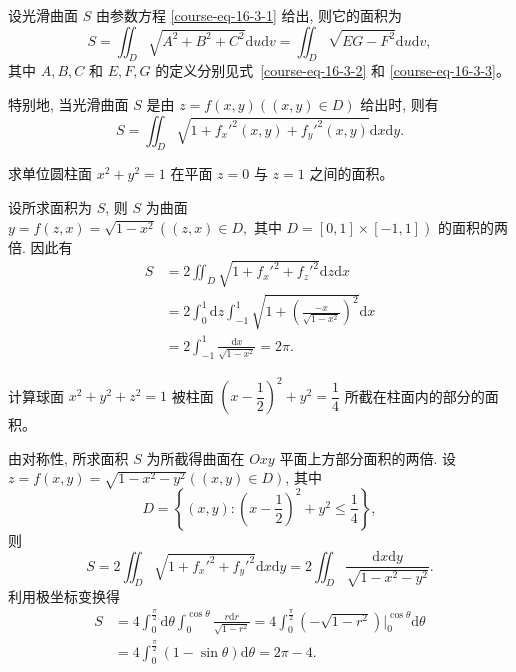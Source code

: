 \documentclass[12pt,fontset=fandol]{ctexart}
\begin{document}
\begin{theorem}\label{course-theorem-16-3-1}\quad 设光滑曲面 $S$ 由参数方程 \eqref{course-eq-16-3-1}  给出, 则它的面积为
\[
  S=\iint_D \sqrt{A^2+B^2+C^2}\mathrm du\mathrm dv
  =\iint_D \sqrt{EG-F^2}\mathrm du\mathrm dv,
\]
其中 $A,B,C$ 和 $E,F,G$ 的定义分别见式~\eqref{course-eq-16-3-2}  和 \eqref{course-eq-16-3-3}。

特别地, 当光滑曲面 $S$ 是由 $z=f(x,y)((x,y)\in D)$ 给出时, 则有
\[
  S=\iint_D \sqrt{1+f_x'^2(x,y)+f_y'^2(x,y)}\mathrm dx\mathrm dy.
\]

\end{theorem}
\begin{example}\label{course-example-16-3-1}\quad 求单位圆柱面 $x^2+y^2=1$ 在平面 $z=0$ 与 $z=1$ 之间的面积。

\end{example}
\begin{solve}\quad 设所求面积为 $S$, 则 $S$ 为曲面 $y=f(z,x)=\sqrt{1-x^2}((z,x)\in D,\text{ 其中 }D=[0,1]\times[-1,1])$ 的面积的两倍. 因此有
\[
\begin{aligned}
  S&=2\iint_D\sqrt{1+f_x'^2+f_z'^2}\mathrm dz\mathrm dx\\
  &=2\int_0^1\mathrm dz\int_{-1}^1\sqrt{1+\left(\frac{-x}{\sqrt{1-x^2}}\right)^2}\mathrm dx\\
  &=2\int_{-1}^1\frac{\mathrm dx}{\sqrt{1-x^2}}=2\pi.
\end{aligned}
\]

\end{solve}
\begin{example}\label{course-example-16-3-2}\quad 计算球面 $x^2+y^2+z^2=1$ 被柱面 $\left(x-\dfrac12\right)^2+y^2=\dfrac14$ 所截在柱面内的部分的面积。

\end{example}
\begin{solve}\quad 由对称性, 所求面积 $S$ 为所截得曲面在 $Oxy$ 平面上方部分面积的两倍. 设 $z=f(x,y)=\sqrt{1-x^2-y^2}((x,y)\in D)$, 其中
\[
  D=\left\{(x,y):\left(x-\frac12\right)^2+y^2\leqslant\frac14\right\},
\]
则
\[
  S=2\iint_D\sqrt{1+f_x'^2+f_y'^2}\mathrm dx\mathrm dy
  =2\iint_D\frac{\mathrm dx\mathrm dy}{\sqrt{1-x^2-y^2}}.
\]
利用极坐标变换得
\[
\begin{aligned}
  S&=4\int_0^{\frac\pi2}\mathrm d\theta\int_0^{\cos\theta}
  \frac{r\mathrm dr}{\sqrt{1-r^2}}
  =4\int_0^{\frac\pi2}\left(-\sqrt{1-r^2}\right)\bigg|_0^{\cos\theta}\mathrm d\theta\\
  &=4\int_0^{\frac\pi2}(1-\sin\theta)\mathrm d\theta=2\pi-4.
\end{aligned}
\]

\end{solve}
\end{document}
